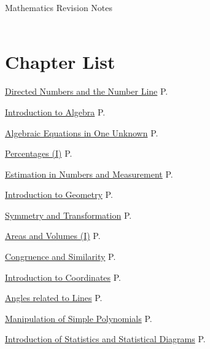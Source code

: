 \documentclass[12pt, a4paper]{article}
\begin{document}
\newpage
\newpage
\thispagestyle{empty}
\begin{center}
Mathematics Revision Notes\\\vspace{1cm}
\greybox{\fontsize{24pt}{24pt}\selectfont {S1 Chapters}} \\\vspace{1cm}
\end{center}
\vspace{0.5cm}
\hline
\section*{Chapter List}
\begin{enumx}[label=Ch \arabic*. , leftmargin=2cm,rightmargin=0pt,labelwidth=17mm, itemsep=3pt, topsep=3mm, labelsep=2mm, labelindent=0pt, align=left, partopsep=0mm ]
\item \hyperref[chapter:S1-1]{Directed Numbers and the Number Line} \hfill P.\pageref{chapter:S1-1}
\item \hyperref[chapter:S1-2]{Introduction to Algebra} \hfill P.\pageref{chapter:S1-2}
\item \hyperref[chapter:S1-3]{Algebraic Equations in One Unknown} \hfill P.\pageref{chapter:S1-3}
\item \hyperref[chapter:S1-4]{Percentages (I)} \hfill P.\pageref{chapter:S1-4}
\item \hyperref[chapter:S1-5]{Estimation in Numbers and Measurement} \hfill P.\pageref{chapter:S1-5}
\item \hyperref[chapter:S1-6]{Introduction to Geometry} \hfill P.\pageref{chapter:S1-6}
\item \hyperref[chapter:S1-7]{Symmetry and Transformation} \hfill P.\pageref{chapter:S1-7}
\item \hyperref[chapter:S1-8]{Areas and Volumes (I)} \hfill P.\pageref{chapter:S1-8}
\item \hyperref[chapter:S1-9]{Congruence and Similarity} \hfill P.\pageref{chapter:S1-9}
\item \hyperref[chapter:S1-10]{Introduction to Coordinates} \hfill P.\pageref{chapter:S1-10}
\item \hyperref[chapter:S1-11]{Angles related to Lines} \hfill P.\pageref{chapter:S1-11}
\item \hyperref[chapter:S1-12]{Manipulation of Simple Polynomials} \hfill P.\pageref{chapter:S1-12}
\item \hyperref[chapter:S1-13]{Introduction of Statistics and Statistical Diagrams} \hfill P.\pageref{chapter:S1-13}
\end{enumx}
\end{document}
